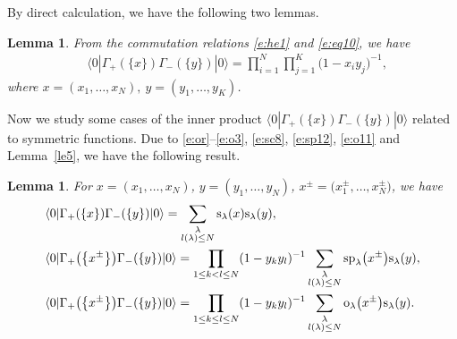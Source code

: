 \documentclass[10pt,a4paper]{amsart}
\numberwithin{equation}{section}
\newtheorem{Lemma}[Theorem]{Lemma}
\begin{document}
By direct calculation, we have the following two lemmas.
\begin{Lemma}\label{le} From the commutation relations \eqref{e:he1} and \eqref{e:eq10}, we have
\begin{align*}
&\langle 0|\Gamma_+(\{x\})\Gamma_-(\{y\})|0\rangle = \prod^N_{i=1}\prod^K_{j=1}\big(1-x_iy_j\big)^{-1},
\end{align*}
where $x=(x_1,\dots,x_N),~y=(y_1,\dots,y_K)$.
\end{Lemma}
Now we study some cases of the inner product $\langle 0|\Gamma_+(\{x\})\Gamma_-(\{y\})|0\rangle$ related to symmetric functions. Due to \eqref{e:or}--\eqref{e:o3}, \eqref{e:sc8}, \eqref{e:sp12}, \eqref{e:o11} and Lemma~\ref{le5}, we have the following result.
\begin{Lemma}\label{le6} For $x=(x_1,\dots,x_N)$, $y=(y_1,\dots,y_N)$, $x^{\pm}=\big(x^{\pm}_1,\dots,x^{\pm}_N\big)$, we have
\begin{align*}
&\langle 0|\Gamma_+(\{x\})\Gamma_-(\{y\})|0\rangle=\sum_{\substack{\lambda\\l(\lambda)\leq N}}{\rm s}_\lambda(x){\rm s}_\lambda(y),\\ %
&\langle 0|\Gamma_+\big(\big\{x^{\pm}\big\}\big)\Gamma_-(\{y\})|0\rangle=\prod_{1\leq k< l\leq N}(1-y_ky_l)^{-1}\sum_{\substack{\lambda\\l(\lambda)\leq N}}{\rm sp}_\lambda\big(x^{\pm}\big){\rm s}_\lambda(y),\\ %
&\langle 0|\Gamma_+\big(\big\{x^{\pm}\big\}\big)\Gamma_-(\{y\})|0\rangle=\prod_{1\leq k\leq l\leq N}(1-y_ky_l)^{-1}\sum_{\substack{\lambda\\l(\lambda)\leq N}}{\rm o}_\lambda\big(x^{\pm}\big){\rm s}_\lambda(y). %
\end{align*}
\end{Lemma}
\end{document}
